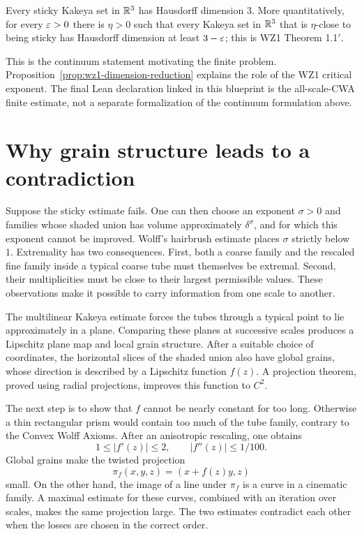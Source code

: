 \begin{theorem}
\label{thm:wz1-continuum}
Every sticky Kakeya set in $\mathbb{R}^3$ has Hausdorff dimension $3$.
More quantitatively, for every $\varepsilon>0$ there is $\eta>0$ such that
every Kakeya set in $\mathbb{R}^3$ that is $\eta$-close to being sticky has
Hausdorff dimension at least $3-\varepsilon$; this is WZ1 Theorem 1.1$'$.
\end{theorem}

This is the continuum statement motivating the finite problem.
Proposition~\ref{prop:wz1-dimension-reduction} explains the role of
the WZ1 critical exponent. The final Lean declaration linked in this
blueprint is the all-scale-CWA finite estimate, not a separate
formalization of the continuum formulation above.

\section{Why grain structure leads to a contradiction}

Suppose the sticky estimate fails. One can then choose an exponent
$\sigma>0$ and families whose shaded union has volume approximately
$\delta^\sigma$, and for which this exponent cannot be improved. Wolff's
hairbrush estimate places $\sigma$ strictly below $1$. Extremality has
two consequences. First, both a coarse family and the rescaled fine
family inside a typical coarse tube must themselves be extremal.
Second, their multiplicities must be close to their largest permissible
values. These observations make it possible to carry information from
one scale to another.

The multilinear Kakeya estimate forces the tubes through a typical point
to lie approximately in a plane. Comparing these planes at successive
scales produces a Lipschitz plane map and local grain structure. After
a suitable choice of coordinates, the horizontal slices of the shaded
union also have global grains, whose direction is described by a
Lipschitz function $f(z)$. A projection theorem, proved using radial
projections, improves this function to $C^2$.

The next step is to show that $f$ cannot be nearly constant for too long.
Otherwise a thin rectangular prism would contain too much of the tube
family, contrary to the Convex Wolff Axioms. After an anisotropic
rescaling, one obtains
\[
  1\leq |f'(z)|\leq 2,\qquad |f''(z)|\leq 1/100.
\]
Global grains make the twisted projection
\[
  \pi_f(x,y,z)=(x+f(z)y,z)
\]
small. On the other hand, the image of a line under $\pi_f$ is a curve
in a cinematic family. A maximal estimate for these curves, combined
with an iteration over scales, makes the same projection large. The
two estimates contradict each other when the losses are chosen in the
correct order.

